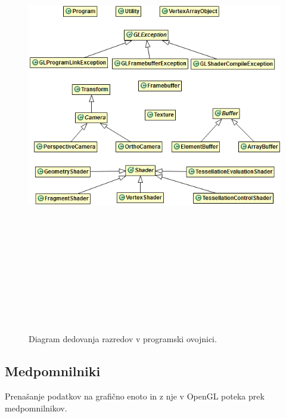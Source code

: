 \documentclass[a4paper, 12pt]{book}
\begin{document}
\begin{figure}[h!]
\begin{center}
\includegraphics[width=16cm, height=20cm, keepaspectratio=true]{class_diagram.png}
\end{center}
\caption{Diagram dedovanja razredov v programski ovojnici.}
\label{classdiagram}
\end{figure}


\subsection*{Medpomnilniki}

Prenašanje podatkov na grafično enoto in z nje v OpenGL poteka prek medpomnilnikov. 
\end{document}
